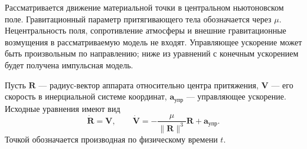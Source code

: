\documentclass[a4paper,11pt]{article}
\numberwithin{equation}{section}
\theoremstyle{remark}
\begin{document}
Рассматривается движение материальной точки в центральном ньютоновском
поле. Гравитационный параметр притягивающего тела обозначается через
$\mu$. Нецентральность поля, сопротивление атмосферы и внешние
гравитационные возмущения в рассматриваемую модель не входят.
Управляющее ускорение может быть произвольным по направлению; ниже
из уравнений с конечным ускорением будет получена импульсная модель.

Пусть $\boldsymbol R$ --- радиус-вектор аппарата относительно центра
притяжения, $\boldsymbol V$ --- его скорость в инерциальной системе
координат, $\boldsymbol a_{\text{упр}}$ --- управляющее ускорение.
Исходные уравнения имеют вид
\begin {equation}
 \dot{\boldsymbol R}=\boldsymbol V,\qquad
 \dot{\boldsymbol V}=-\frac{{\mu}}{{\lVert\boldsymbol R\rVert^3}}
 \boldsymbol R+\boldsymbol a_{\text{упр}}.
 \label {eq:cartesian-dynamics}
\end {equation}
Точкой обозначается производная по физическому времени $t$.
\end{document}
